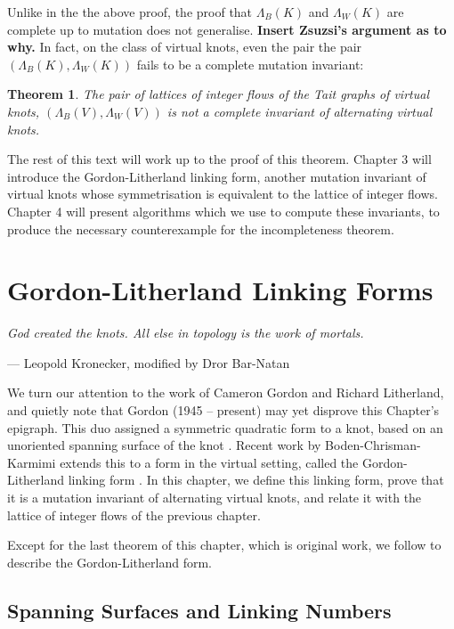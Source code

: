 \documentclass[12pt]{report}
\newcommand{\notered}[1]{{\color{Red} \textbf{#1}}}
\newtheorem*{theorem}{Theorem}
\theoremstyle{upright}
\begin{document}
Unlike in the the above proof, the proof that $\Lambda_{B}(K)$ and $\Lambda_{W}(K)$ are complete up to mutation does not generalise. \notered{Insert Zsuzsi's argument as to why.} In fact, on the class of virtual knots, even the pair the pair $\left(\Lambda_{B}(K), \Lambda_{W}(K)\right)$ fails to be a complete mutation invariant:

\begin{theorem}
The pair of lattices of integer flows of the Tait graphs of virtual knots, $(\Lambda_{B}(V), \Lambda_{W}(V))$ is not a complete invariant of alternating virtual knots.
\end{theorem}

The rest of this text will work up to the proof of this theorem. Chapter 3 will introduce the Gordon-Litherland linking form, another mutation invariant of virtual knots whose symmetrisation is equivalent to the lattice of integer flows. Chapter 4 will present algorithms which we use to compute these invariants, to produce the necessary counterexample for the incompleteness theorem.


\chapter{Gordon-Litherland Linking Forms}

\epigraph{\itshape God created the knots. All else in topology is the work of mortals.}{--- Leopold Kronecker, modified by Dror Bar-Natan}

We turn our attention to the work of Cameron Gordon and Richard Litherland, and quietly note that Gordon (1945 -- present) may yet disprove this Chapter's epigraph. This duo assigned a symmetric quadratic form to a knot, based on an unoriented spanning surface of the knot \cite{signature-of-a-link}. Recent work by Boden-Chrisman-Karmimi extends this to a form in the virtual setting, called the Gordon-Litherland linking form \cite{gordon-litherland-pairing-thickened-surfaces}. In this chapter, we define this linking form, prove that it is a mutation invariant of alternating virtual knots, and relate it with the lattice of integer flows of the previous chapter.

Except for the last theorem of this chapter, which is original work, we follow \cite{gordon-litherland-pairing-thickened-surfaces, alternating-links-thickened-surfaces, mock-seifert-matrices, virtual-knot-groups-almost-classical-knots} to describe the Gordon-Litherland form.

\section{Spanning Surfaces and Linking Numbers}
\end{document}
